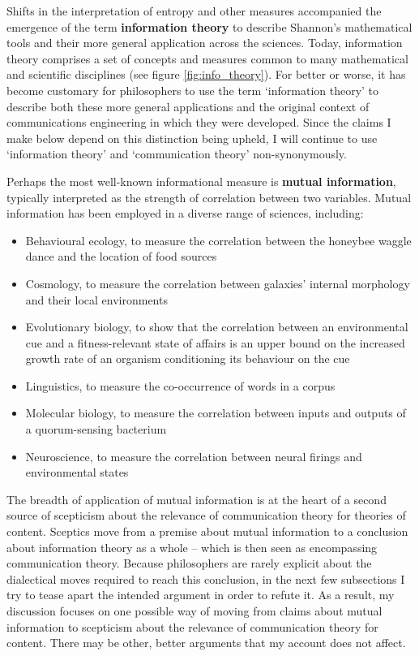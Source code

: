 \documentclass[12pt]{article}
\begin{document}
Shifts in the interpretation of entropy and other measures accompanied the emergence of the term \textbf{information theory} to describe Shannon's mathematical tools and their more general application across the sciences.
Today, information theory comprises a set of concepts and measures common to many mathematical and scientific disciplines (see figure \ref{fig:info_theory}).
For better or worse, it has become customary for philosophers to use the term `information theory' to describe both these more general applications and the original context of communications engineering in which they were developed.
Since the claims I make below depend on this distinction being upheld, I will continue to use `information theory' and `communication theory' non-synonymously.



Perhaps the most well-known informational measure is \textbf{mutual information}, typically interpreted as the strength of correlation between two variables.
Mutual information has been employed in a diverse range of sciences, including:

\begin{itemize}
    \item Behavioural ecology, to measure the correlation between the honeybee waggle dance and the location of food sources \citep{haldane1954statistical}
    \item Cosmology, to measure the correlation between galaxies' internal morphology and their local environments \citep{pandey2017how}
    \item Evolutionary biology, to show that the correlation between an environmental cue and a fitness-relevant state of affairs is an upper bound on the increased growth rate of an organism conditioning its behaviour on the cue \citep{donaldson-matasci2010fitness}
    \item Linguistics, to measure the co-occurrence of words in a corpus \citep[$\S$4]{hunston2002corpora}
    \item Molecular biology, to measure the correlation between inputs and outputs of a quorum-sensing bacterium \citep{mehta2009information}
    \item Neuroscience, to measure the correlation between neural firings and environmental states \citep[][and references therein]{rathkopf2017neural}
\end{itemize}

\noindent The breadth of application of mutual information is at the heart of a second source of scepticism about the relevance of communication theory for theories of content.
Sceptics move from a premise about mutual information to a conclusion about information theory as a whole -- which is then seen as encompassing communication theory.
Because philosophers are rarely explicit about the dialectical moves required to reach this conclusion, in the next few subsections I try to tease apart the intended argument in order to refute it.
As a result, my discussion focuses on one possible way of moving from claims about mutual information to scepticism about the relevance of communication theory for content.
There may be other, better arguments that my account does not affect.
\end{document}
